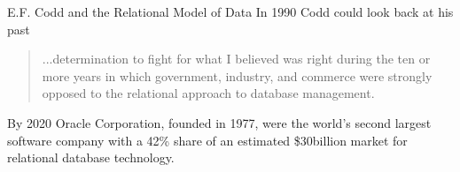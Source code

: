 \iffalse
\begin{frame}{E.F. Codd 1970}
\begin{itemize}
	\item In 1970 E.F.Codd introduces the relational model of data and introduces the idea of normal form.
\end{itemize}
	\displaybibentry{Codd1970}
\end{frame}

\begin{frame}{E.F. Codd 1971}
In 1971, the terms `functional dependency' and  `third normal form' are introduced 
in an IBM techical report published in a now out of print book (also unavailable on Amazon).

\displaybibentry{Codd1971} 
\end{frame}

\begin{frame}{Fagin 1977,1979}
\begin{itemize}
	\item In 1977 Fagin introduces `fourth normal form' (4NF) and `multivalued dependencies'.
	\item In 1979, Fagin describes `projection-join normal form' also known as fifth normal form (5NF).
\end{itemize}
\displaybibentry{Fagin1977} 

\displaybibentry{Fagin1979} 
\end{frame}

\begin{frame}{Normal Forms}
Ling and Goh 1992 
\begin{quote}
Since
classical normal forms (including the Improved 3NF)
have failed to consider the effects of INDs on the structure
of a database, they are inadequate in characterizing a
database scheme which is truly devoid of redundancies.
In consideration of the above, we propose a new normal
form, called Inclusion Normal Form (IN-NF)...
\end{quote}
\end{frame}
\fi
\begin{frame}{E.F. Codd and the Relational Model of Data}
In 1990 Codd could look back at his past
\begin{quote}
...determination to
fight for what I believed was right during the ten or
more years in which government, industry, and
commerce were strongly opposed to the relational
approach to database management.
\end{quote} 

By 2020 Oracle Corporation, founded in 1977, were the world's second largest software company with a 42\% share of an 
estimated \$30billion market for relational database technology. 
\end{frame}

